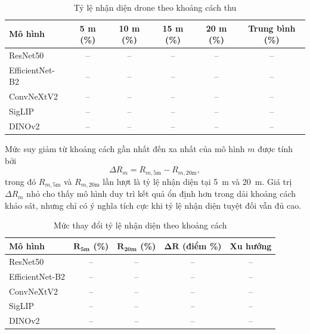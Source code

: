 \documentclass[../DoAn.tex]{subfiles}
\begin{document}
\begin{table}[H]
    \centering
    \caption{Tỷ lệ nhận diện drone theo khoảng cách thu}
    \label{tab:distance_recognition_results}
    \renewcommand{\arraystretch}{1.3}
    \begin{tabular}{|p{}|c|c|c|c|c|}
        \hline
        \textbf{Mô hình} & \textbf{5 m (\%)} & \textbf{10 m (\%)} & \textbf{15 m (\%)} & \textbf{20 m (\%)} & \textbf{Trung bình (\%)} \\ \hline
        ResNet50 & -- & -- & -- & -- & -- \\ \hline
        EfficientNet-B2 & -- & -- & -- & -- & -- \\ \hline
        ConvNeXtV2 & -- & -- & -- & -- & -- \\ \hline
        SigLIP & -- & -- & -- & -- & -- \\ \hline
        DINOv2 & -- & -- & -- & -- & -- \\ \hline
    \end{tabular}
\end{table}


Mức suy giảm từ khoảng cách gần nhất đến xa nhất của mô hình $m$ được tính bởi
\begin{equation}
    \Delta R_m
    =
    R_{m,5\mathrm{m}}
    -
    R_{m,20\mathrm{m}},
    \label{eq:distance_recall_drop}
\end{equation}
trong đó $R_{m,5\mathrm{m}}$ và $R_{m,20\mathrm{m}}$ lần lượt là tỷ lệ nhận diện tại 5~m và 20~m. Giá trị $\Delta R_m$ nhỏ cho thấy mô hình duy trì kết quả ổn định hơn trong dải khoảng cách khảo sát, nhưng chỉ có ý nghĩa tích cực khi tỷ lệ nhận diện tuyệt đối vẫn đủ cao.

\begin{table}[H]
    \centering
    \caption{Mức thay đổi tỷ lệ nhận diện theo khoảng cách}
    \label{tab:distance_degradation}
    \renewcommand{\arraystretch}{1.3}
    \begin{tabular}{|p{}|c|c|c|c|}
        \hline
        \textbf{Mô hình} & $\mathbf{R_{5m}}$ \textbf{(\%)} & $\mathbf{R_{20m}}$ \textbf{(\%)} & $\boldsymbol{\Delta R}$ \textbf{(điểm \%)} & \textbf{Xu hướng} \\ \hline
        ResNet50 & -- & -- & -- & -- \\ \hline
        EfficientNet-B2 & -- & -- & -- & -- \\ \hline
        ConvNeXtV2 & -- & -- & -- & -- \\ \hline
        SigLIP & -- & -- & -- & -- \\ \hline
        DINOv2 & -- & -- & -- & -- \\ \hline
    \end{tabular}
\end{table}
\end{document}
